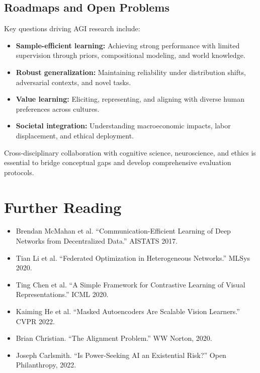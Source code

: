 \documentclass{article}
\begin{document}
\subsection{Roadmaps and Open Problems}
Key questions driving AGI research include:
\begin{itemize}
  \item \textbf{Sample-efficient learning:} Achieving strong performance with limited supervision through priors, compositional modeling, and world knowledge.
  \item \textbf{Robust generalization:} Maintaining reliability under distribution shifts, adversarial contexts, and novel tasks.
  \item \textbf{Value learning:} Eliciting, representing, and aligning with diverse human preferences across cultures.
  \item \textbf{Societal integration:} Understanding macroeconomic impacts, labor displacement, and ethical deployment.
\end{itemize}
Cross-disciplinary collaboration with cognitive science, neuroscience, and ethics is essential to bridge conceptual gaps and develop comprehensive evaluation protocols.
\FloatBarrier

\section*{Further Reading}
\begin{itemize}
  \item Brendan McMahan et al. ``Communication-Efficient Learning of Deep Networks from Decentralized Data.'' AISTATS 2017.
  \item Tian Li et al. ``Federated Optimization in Heterogeneous Networks.'' MLSys 2020.
  \item Ting Chen et al. ``A Simple Framework for Contrastive Learning of Visual Representations.'' ICML 2020.
  \item Kaiming He et al. ``Masked Autoencoders Are Scalable Vision Learners.'' CVPR 2022.
  \item Brian Christian. ``The Alignment Problem.'' WW Norton, 2020.
  \item Joseph Carlsmith. ``Is Power-Seeking AI an Existential Risk?'' Open Philanthropy, 2022.
\end{itemize}
\end{document}
